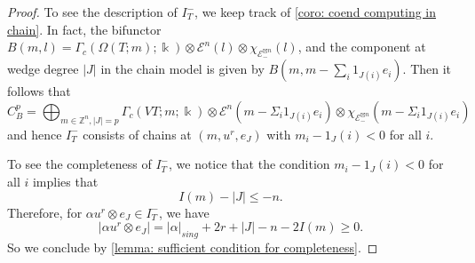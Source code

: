 \documentclass[11pt]{amsart}
\numberwithin{equation}{section}
\theoremstyle{plain}
\theoremstyle{definition}
\theoremstyle{remark}
\newcommand{\bZ} { {\mathbb{Z}}}
\newcommand{\cE} { {\mathcal{E}}}
\begin{document}
\begin{proof}
To see the description of $I_T^-$, we keep track of \autoref{coro: coend computing in chain}. In fact, the bifunctor $B(m,l)=\Gamma_c({ \Omega(T;m)} ;\Bbbk  )\otimes \cE^n(l) \otimes \chi_{\cE_-^{\boxtimes n}}(l)$, and the component at wedge degree $|J|$ in the chain model is given by $B(m,m-\sum_i 1_{J(i)}e_{i})$. Then it follows that 
\[C_B^p = \bigoplus_{m\in \bZ^n,|J|=p}\Gamma_c(V{T;m}; \Bbbk) \otimes \cE^n(m- \Sigma_i1_{J(i)}e_i) \otimes \chi_{\cE_-^{\boxtimes n}}(m- \Sigma_i1_{J(i)}e_i)\]
and hence $I_T^-$ consists of chains at  $(m,u^r,e_J)$ with $m_i-1_{J}(i)<0$ for all $i$. 

To see the completeness of $I_T^-$, we notice that the condition $m_i-1_{J}(i)<0$ for all $i$ implies that
\[I(m)-|J|\leq -n.\]
Therefore, for $\alpha u^r\otimes e_J\in I_T^-$, we have
\[|\alpha u^r\otimes e_J|=|\alpha|_{sing}+2r+|J|-n-2I(m)\geq 0. \]
So we conclude by \autoref{lemma: sufficient condition for completeness}.
\end{proof}
\end{document}
